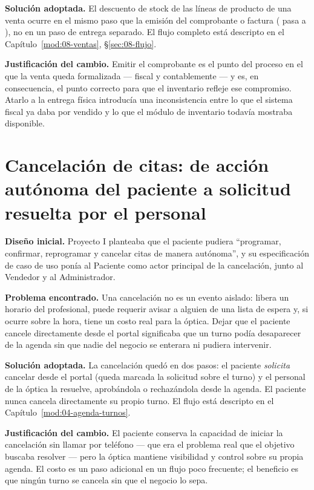 \textbf{Solución adoptada.} El descuento de stock de las líneas de producto de una venta ocurre en el mismo paso que la emisión del comprobante o factura ( pasa a \allowbreak {}), no en un paso de entrega separado. El flujo completo está descripto en el Capítulo~\ref{mod:08-ventas}, \S\ref{sec:08-flujo}.

\textbf{Justificación del cambio.} Emitir el comprobante es el punto del proceso en el que la venta queda formalizada --- fiscal y contablemente --- y es, en consecuencia, el punto correcto para que el inventario refleje ese compromiso. Atarlo a la entrega física introducía una inconsistencia entre lo que el sistema fiscal ya daba por vendido y lo que el módulo de inventario todavía mostraba disponible.

\section{Cancelación de citas: de acción autónoma del paciente a solicitud resuelta por el personal}
\label{sec:cambios-cancelacion}

\textbf{Diseño inicial.} Proyecto I planteaba que el paciente pudiera ``programar, confirmar, reprogramar y cancelar citas de manera autónoma'', y su especificación de caso de uso ponía al Paciente como actor principal de la cancelación, junto al Vendedor y al Administrador.

\textbf{Problema encontrado.} Una cancelación no es un evento aislado: libera un horario del profesional, puede requerir avisar a alguien de una lista de espera y, si ocurre sobre la hora, tiene un costo real para la óptica. Dejar que el paciente cancele directamente desde el portal significaba que un turno podía desaparecer de la agenda sin que nadie del negocio se enterara ni pudiera intervenir.

\textbf{Solución adoptada.} La cancelación quedó en dos pasos: el paciente \emph{solicita} cancelar desde el portal (queda marcada la solicitud sobre el turno) y el personal de la óptica la resuelve, aprobándola o rechazándola desde la agenda. El paciente nunca cancela directamente su propio turno. El flujo está descripto en el Capítulo~\ref{mod:04-agenda-turnos}.

\textbf{Justificación del cambio.} El paciente conserva la capacidad de iniciar la cancelación sin llamar por teléfono --- que era el problema real que el objetivo buscaba resolver --- pero la óptica mantiene visibilidad y control sobre su propia agenda. El costo es un paso adicional en un flujo poco frecuente; el beneficio es que ningún turno se cancela sin que el negocio lo sepa.

